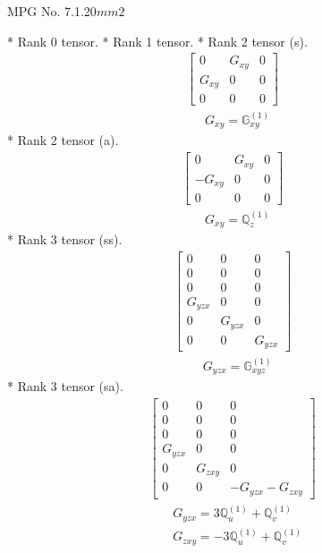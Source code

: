 \documentclass[fleqn,8pt,landscape]{jsarticle}
\begin{document}
\setcounter{MaxMatrixCols}{32}

\renewcommand{\tablename}{Table~}
\renewcommand{\figurename}{Figure~}
\begin{center}
\LARGE
MPG No. 7.1.20\quad$mm2$
\end{center}
* Rank 0 tensor.
* Rank 1 tensor.
* Rank 2 tensor (s).
\begin{align*}
\begin{bmatrix} 0 & G_{xy} & 0 \\ G_{xy} & 0 & 0 \\ 0 & 0 & 0 \end{bmatrix}
\end{align*}
\begin{align*}
& G_{xy} = \mathbb{G}_{xy}^{(1)}
\end{align*}
* Rank 2 tensor (a).
\begin{align*}
\begin{bmatrix} 0 & G_{xy} & 0 \\ - G_{xy} & 0 & 0 \\ 0 & 0 & 0 \end{bmatrix}
\end{align*}
\begin{align*}
& G_{xy} = \mathbb{Q}_{z}^{(1)}
\end{align*}
* Rank 3 tensor (ss).
\begin{align*}
\begin{bmatrix} 0 & 0 & 0 \\ 0 & 0 & 0 \\ 0 & 0 & 0 \\ G_{yzx} & 0 & 0 \\ 0 & G_{yzx} & 0 \\ 0 & 0 & G_{yzx} \end{bmatrix}
\end{align*}
\begin{align*}
& G_{yzx} = \mathbb{G}_{xyz}^{(1)}
\end{align*}
* Rank 3 tensor (sa).
\begin{align*}
\begin{bmatrix} 0 & 0 & 0 \\ 0 & 0 & 0 \\ 0 & 0 & 0 \\ G_{yzx} & 0 & 0 \\ 0 & G_{zxy} & 0 \\ 0 & 0 & - G_{yzx} - G_{zxy} \end{bmatrix}
\end{align*}
\begin{align*}
& G_{yzx} = 3 \mathbb{Q}_{u}^{(1)} + \mathbb{Q}_{v}^{(1)} \\
& G_{zxy} = - 3 \mathbb{Q}_{u}^{(1)} + \mathbb{Q}_{v}^{(1)}
\end{align*}
\end{document}
